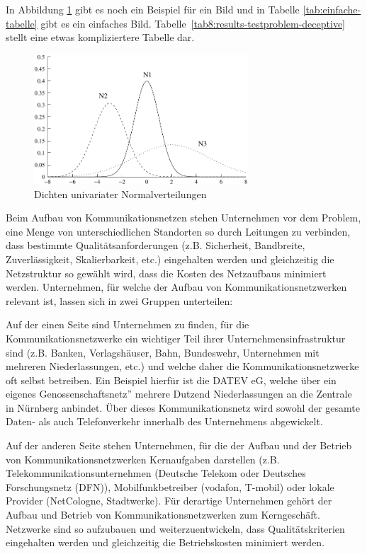 In Abbildung \ref{fig:2dnorm} gibt es noch ein Beispiel f{\"u}r ein Bild und in Tabelle \ref{tab:einfache-tabelle} gibt es ein einfaches Bild. Tabelle~\ref{tab8:results-testproblem-deceptive} stellt eine etwas kompliziertere Tabelle dar. 
\begin{figure}[htb]
        \begin{center}
        \includegraphics[width=8cm]{grafiken/norm_uni}
        \caption{Dichten univariater Normalverteilungen}
        \label{fig:2dnorm}
        \end{center}
\end{figure}


Beim Aufbau von Kommunikationsnetzen stehen Unternehmen vor dem Problem, eine Menge von unterschiedlichen Standorten so durch Leitungen zu verbinden, dass bestimmte Qualit{\"a}tsanforderungen (z.B. Sicherheit, Bandbreite, Zu\-ver\-l{\"a}ssig\-keit, Skalierbarkeit, etc.) eingehalten werden und gleichzeitig die Netzstruktur so gew{\"a}hlt wird, dass die Kosten des Netzaufbaus minimiert werden. Unternehmen, f{\"u}r welche der Aufbau von Kommunikationsnetzwerken relevant ist, lassen sich in zwei Gruppen unterteilen:

Auf der einen Seite sind Unternehmen zu finden, f{\"u}r die Kommunikationsnetzwerke ein wichtiger Teil ihrer Unternehmensinfrastruktur sind (z.B. Banken, Verlagsh{\"a}user, Bahn, Bundeswehr, Unternehmen mit mehreren Niederlassungen, etc.) und welche daher die Kommunikationsnetzwerke oft selbst betreiben. Ein Beispiel hierf{\"u}r ist die DATEV eG, welche {\"u}ber ein eigenes \glqq Genossenschaftsnetz'' mehrere Dutzend Niederlassungen an die Zentrale in N{\"u}rnberg anbindet. {\"U}ber dieses Kommunikationsnetz wird sowohl der gesamte Daten- als auch Telefonverkehr innerhalb des Unternehmens abgewickelt.


Auf der anderen Seite stehen Unternehmen, f{\"u}r die der Aufbau und der Betrieb von Kommunikationsnetzwerken Kernaufgaben darstellen (z.B. Telekommunikationsunternehmen (Deutsche Telekom oder Deutsches Forschungsnetz (DFN)), Mobilfunkbetreiber (vodafon, T-mobil) oder lokale Provider (NetCologne, Stadtwerke). F{\"u}r derartige Unternehmen geh{\"o}rt der Aufbau und Betrieb von Kommunikationsnetzwerken zum Kerngesch{\"a}ft. Netzwerke sind so aufzubauen und weiterzuentwickeln, dass Qualit{\"a}tskriterien eingehalten werden und gleichzeitig die Betriebskosten minimiert werden. 





